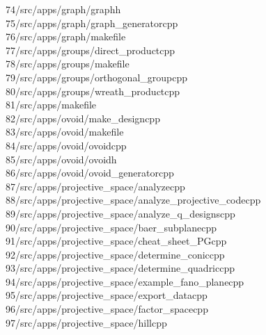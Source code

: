 \begin{tabbing}
74\>/src/apps/graph/graphh\\[0pt]
75\>/src/apps/graph/graph\_generatorcpp\\[0pt]
76\>/src/apps/graph/makefile\\[0pt]
77\>/src/apps/groups/direct\_productcpp\\[0pt]
78\>/src/apps/groups/makefile\\[0pt]
79\>/src/apps/groups/orthogonal\_groupcpp\\[0pt]
80\>/src/apps/groups/wreath\_productcpp\\[0pt]
81\>/src/apps/makefile\\[0pt]
82\>/src/apps/ovoid/make\_designcpp\\[0pt]
83\>/src/apps/ovoid/makefile\\[0pt]
84\>/src/apps/ovoid/ovoidcpp\\[0pt]
85\>/src/apps/ovoid/ovoidh\\[0pt]
86\>/src/apps/ovoid/ovoid\_generatorcpp\\[0pt]
87\>/src/apps/projective\_space/analyzecpp\\[0pt]
88\>/src/apps/projective\_space/analyze\_projective\_codecpp\\[0pt]
89\>/src/apps/projective\_space/analyze\_q\_designscpp\\[0pt]
90\>/src/apps/projective\_space/baer\_subplanecpp\\[0pt]
91\>/src/apps/projective\_space/cheat\_sheet\_PGcpp\\[0pt]
92\>/src/apps/projective\_space/determine\_coniccpp\\[0pt]
93\>/src/apps/projective\_space/determine\_quadriccpp\\[0pt]
94\>/src/apps/projective\_space/example\_fano\_planecpp\\[0pt]
95\>/src/apps/projective\_space/export\_datacpp\\[0pt]
96\>/src/apps/projective\_space/factor\_spacecpp\\[0pt]
97\>/src/apps/projective\_space/hillcpp\\[0pt]

\end{tabbing}
